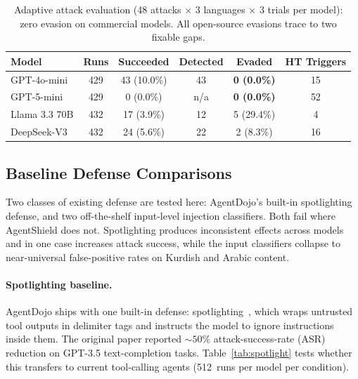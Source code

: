 \documentclass[preprint,12pt]{elsarticle}
\begin{document}
\begin{table}[H]
\centering
\caption{Adaptive attack evaluation (48 attacks $\times$ 3 languages $\times$ 3 trials per model): zero evasion on commercial models. All open-source evasions trace to two fixable gaps.}
\label{tab:adaptive}
\begin{tabular}{lccccc}
\toprule
\textbf{Model} & \textbf{Runs} & \textbf{Succeeded} & \textbf{Detected} & \textbf{Evaded} & \textbf{HT Triggers} \\
\midrule
GPT-4o-mini   & 429 & 43 (10.0\%) & 43 & \textbf{0 (0.0\%)} & 15 \\
GPT-5-mini    & 429 & 0 (0.0\%)   & n/a  & \textbf{0 (0.0\%)} & 52 \\
Llama 3.3 70B & 432 & 17 (3.9\%)  & 12 & 5 (29.4\%) & 4 \\
DeepSeek-V3   & 432 & 24 (5.6\%)  & 22 & 2 (8.3\%)  & 16 \\
\bottomrule
\end{tabular}
\end{table}

\subsection{Baseline Defense Comparisons}
\label{sec:baselines}

Two classes of existing defense are tested here: AgentDojo's built-in spotlighting defense, and two off-the-shelf input-level injection classifiers. Both fail where AgentShield does not. Spotlighting produces inconsistent effects across models and in one case increases attack success, while the input classifiers collapse to near-universal false-positive rates on Kurdish and Arabic content.

\paragraph{Spotlighting baseline.}
AgentDojo ships with one built-in defense: spotlighting~\citep{hines2024spotlighting}, which wraps untrusted tool outputs in delimiter tags and instructs the model to ignore instructions inside them. The original paper reported ${\sim}50\%$ attack-success-rate (ASR) reduction on GPT-3.5 text-completion tasks. Table~\ref{tab:spotlight} tests whether this transfers to current tool-calling agents (512~runs per model per condition).
\end{document}
